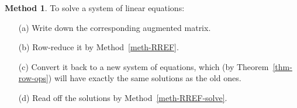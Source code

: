 \documentclass[reqno]{amsart}
\theoremstyle{definition}
\newtheorem{method}[theorem]{Method}
\begin{document}
\begin{method}\label{meth-solve}
 To solve a system of linear equations:
 \begin{itemize}
  \item[(a)] Write down the corresponding augmented matrix.
  \item[(b)] Row-reduce it by Method~\ref{meth-RREF}.
  \item[(c)] Convert it back to a new system of equations, which (by
   Theorem~\ref{thm-row-ops}) will have exactly the same solutions as
   the old ones. 
  \item[(d)] Read off the solutions by Method~\ref{meth-RREF-solve}.
 \end{itemize}
\end{method}
\end{document}
